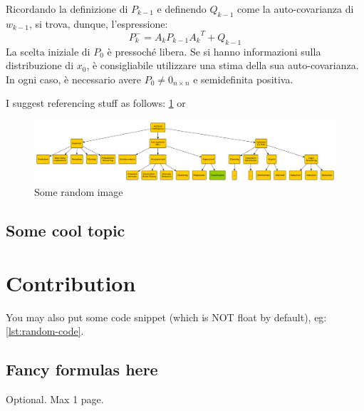 \documentclass[12pt,a4paper,openright,twoside]{book}
\begin{document}
Ricordando la definizione di $P_{k-1}$ e definendo $Q_{k-1}$ come la auto-covarianza di $w_{k-1}$, si trova, dunque, l'espressione:
$$P_k^-=A_kP_{k-1}{A_k}^T+Q_{k-1}$$
La scelta iniziale di $P_0$ è pressoché libera. Se si hanno informazioni sulla distribuzione di $x_0$, è consigliabile utilizzare una stima della sua auto-covarianza. In ogni caso, è necessario avere $P_0\neq 0_{n\times n}$ e semidefinita positiva.

I suggest referencing stuff as follows: \cref{fig:random-image} or 

\begin{figure}
    \centering
    \includegraphics[width=.8\linewidth]{figures/random-image.pdf}
    \caption{Some random image}
    \label{fig:random-image}
\end{figure}

\section{Some cool topic}

\chapter{Contribution}

You may also put some code snippet (which is NOT float by default), eg: \cref{lst:random-code}.



\section{Fancy formulas here}


\backmatter





\begin{acknowledgements} %
Optional. Max 1 page.
\end{acknowledgements}
\end{document}
